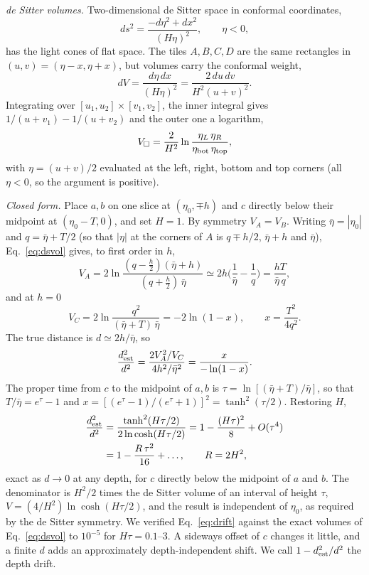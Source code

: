 \documentclass[prd,twocolumn,superscriptaddress,nofootinbib,amsmath,amssymb,floatfix]{revtex4-2}
\begin{document}
\emph{de Sitter volumes.} Two-dimensional de Sitter space in conformal coordinates,
\begin{equation}
ds^2=\frac{-d\eta^2+dx^2}{(H\eta)^2},\qquad\eta<0,
\end{equation}
has the light cones of flat space. The tiles $A,B,C,D$ are the same rectangles in $(u,v)=(\eta-x,\eta+x)$, but volumes carry the conformal weight,
\begin{equation}
dV=\frac{d\eta\,dx}{(H\eta)^2}=\frac{2\,du\,dv}{H^2(u+v)^2}.
\end{equation}
Integrating over $[u_1,u_2]\times[v_1,v_2]$, the inner integral gives $1/(u+v_1)-1/(u+v_2)$ and the outer one a logarithm,
\begin{equation}
V_\square=\frac{2}{H^2}\ln\frac{\eta_L\,\eta_R}{\eta_{\rm bot}\,\eta_{\rm top}},
\label{eq:dsvol}
\end{equation}
with $\eta=(u+v)/2$ evaluated at the left, right, bottom and top corners (all $\eta<0$, so the argument is positive).

\emph{Closed form.} Place $a,b$ on one slice at $(\eta_0,\mp h)$ and $c$ directly below their midpoint at $(\eta_0-T,0)$, and set $H=1$. By symmetry $V_A=V_B$. Writing $\bar\eta=|\eta_0|$ and $q=\bar\eta+T/2$ (so that $|\eta|$ at the corners of $A$ is $q\mp h/2$, $\bar\eta+h$ and $\bar\eta$), Eq.~\eqref{eq:dsvol} gives, to first order in $h$,
\begin{equation}
V_A=2\ln\frac{(q-\tfrac h2)(\bar\eta+h)}{(q+\tfrac h2)\,\bar\eta}\simeq2h\Big(\frac1{\bar\eta}-\frac1q\Big)=\frac{hT}{\bar\eta\,q},
\end{equation}
and at $h=0$
\begin{equation}
V_C=2\ln\frac{q^2}{(\bar\eta+T)\,\bar\eta}=-2\ln(1-x),\qquad x=\frac{T^2}{4q^2}.
\end{equation}
The true distance is $d\simeq2h/\bar\eta$, so
\begin{equation}
\frac{d^2_{\rm est}}{d^2}=\frac{2V_A^2/V_C}{4h^2/\bar\eta^2}=\frac{x}{-\ln(1-x)}.
\end{equation}
The proper time from $c$ to the midpoint of $a,b$ is $\tau=\ln[(\bar\eta+T)/\bar\eta]$, so that $T/\bar\eta=e^{\tau}-1$ and $x=[(e^\tau-1)/(e^\tau+1)]^2=\tanh^2(\tau/2)$. Restoring $H$,
\begin{equation}
\begin{aligned}
\frac{d^2_{\rm est}}{d^2}&=\frac{\tanh^2(H\tau/2)}{2\ln\cosh(H\tau/2)}=1-\frac{(H\tau)^2}{8}+O(\tau^4)\\
&=1-\frac{R\,\tau^2}{16}+\dots,\qquad R=2H^2,
\end{aligned}
\label{eq:drift}
\end{equation}
exact as $d\to0$ at any depth, for $c$ directly below the midpoint of $a$ and $b$. The denominator is $H^2/2$ times the de Sitter volume of an interval of height $\tau$, $V=(4/H^2)\ln\cosh(H\tau/2)$, and the result is independent of $\eta_0$, as required by the de Sitter symmetry. We verified Eq.~\eqref{eq:drift} against the exact volumes of Eq.~\eqref{eq:dsvol} to $10^{-5}$ for $H\tau=0.1$--$3$. A sideways offset of $c$ changes it little, and a finite $d$ adds an approximately depth-independent shift. We call $1-d^2_{\rm est}/d^2$ the depth drift.
\end{document}
